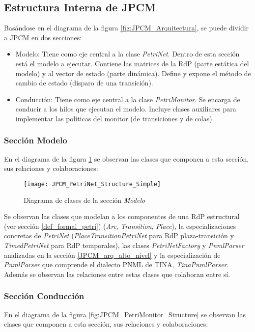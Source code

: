 \subsection{Estructura Interna de JPCM}
Basándose en el diagrama de la figura \ref{fig:JPCM_Arquitectura}, se puede
dividir a JPCM en dos secciones:
\begin{itemize}
    \item Modelo: Tiene como eje central a la clase \textit{PetriNet}.
    Dentro de esta sección está el modelo a ejecutar. Contiene las matrices de
    la RdP (parte estática del modelo) y al vector de estado (parte dinámica).
    Define y expone el método de cambio de estado (disparo de una transición).
    \item Conducción: Tiene como eje central a la clase \textit{PetriMonitor}.
    Se encarga de conducir a los hilos que ejecutan el modelo.
    Incluye clases auxiliares para implementar las políticas del monitor (de
    transiciones y de colas).
\end{itemize}

\subsubsection{Sección Modelo}
En el diagrama de la figura \ref{fig:JPCM_PetriNet_Structure} se observan las
clases que componen a esta sección, sus relaciones y colaboraciones:

\begin{figure}[H]
  \hspace*{-3cm}
  \texttt{[image: JPCM\_PetriNet\_Structure\_Simple]}
  \caption{Diagrama de clases de la sección \textit{Modelo}}
  \label{fig:JPCM_PetriNet_Structure}
\end{figure}

Se observan las clases que modelan a los componentes de una RdP estructural
(ver sección \ref{def_formal_petri}) (\textit{Arc}, \textit{Transition},
\textit{Place}), la especializaciones concretas de \textit{PetriNet}
(\textit{PlaceTransitionPetriNet} para RdP plaza-transición y
\textit{TimedPetriNet} para RdP temporales), las clases \textit{PetriNetFactory}
y \textit{PnmlParser} analizadas en la sección \ref{JPCM_arq_alto_nivel} y la
especialización de \textit{PnmlParser} que comprende el dialecto PNML de TINA,
\textit{TinaPnmlParser}. Además se observan las relaciones entre estas clases
que colaboran entre sí.

\subsubsection{Sección Conducción}
En el diagrama de la figura \ref{fig:JPCM_PetriMonitor_Structure} se observan
las clases que componen a esta sección, sus relaciones y colaboraciones:

